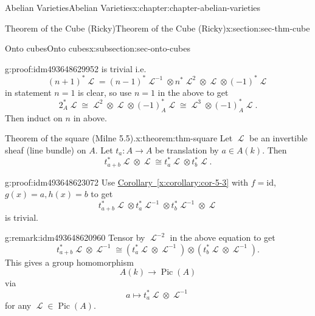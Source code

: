 \documentclass[oneside,10pt,]{book}
\numberwithin{equation}{section}
\newcommand{\sheaf}[1]{\operatorname{\mathcal{#1}}}
\newcommand{\id}{\mathrm{id}}
\DeclareMathOperator{\Pic}{Pic}
\begin{document}
\begin{chapterptx}{Abelian Varieties}{}{Abelian Varieties}{}{}{x:chapter:chapter-abelian-varieties}
\begin{sectionptx}{Theorem of the Cube (Ricky)}{}{Theorem of the Cube (Ricky)}{}{}{x:section:sec-thm-cube}
\begin{subsectionptx}{Onto cubes}{}{Onto cubes}{}{}{x:subsection:sec-onto-cubes}
\begin{proofptx}{}{g:proof:idm493648629952}
is trivial i.e.%
\begin{equation*}
(n+1)^*\sheaf L =  (n-1)^*\sheaf L^{-1}\otimes n^*\sheaf L^2 \otimes   \sheaf L \otimes   (-1)^*\sheaf L
\end{equation*}
in statement \(n = 1\) is clear, so use \(n=1\) in the above to get%
\begin{equation*}
2_A^*\sheaf L \cong \sheaf L^2 \otimes \sheaf L \otimes (-1)^*_A \sheaf L\cong \sheaf L^3 \otimes (-1)_A^*\sheaf  L\text{.}
\end{equation*}
Then induct on \(n\) in above.%
\end{proofptx}
\begin{theorem}{Theorem of the square (Milne 5.5).}{}{x:theorem:thm-square}%
Let \(\sheaf L\) be an invertible sheaf (line bundle) on \(A\). Let \(t_a \colon A\to A\) be translation by \(a\in A(k)\). Then%
\begin{equation*}
t_{a+b}^*\sheaf L \otimes \sheaf L \cong t_a^*\sheaf L \otimes t_b^* \sheaf L\text{.}
\end{equation*}
%
\end{theorem}
\begin{proofptx}{}{g:proof:idm493648623072}
Use \hyperref[x:corollary:cor-5-3]{Corollary~\ref{x:corollary:cor-5-3}} with \(f=  \id\), \(g(x)  = a, h(x) = b\) to get%
\begin{equation*}
t_{a+b}^*\sheaf L \otimes t_{a}^*\sheaf L ^{-1}\otimes t_b^* \sheaf L ^{-1} \otimes \sheaf L
\end{equation*}
is trivial.%
\end{proofptx}
\begin{remark}{}{g:remark:idm493648620960}%
Tensor by \(\sheaf L^{-2}\) in the above equation to get%
\begin{equation*}
t_{a+b}^*\sheaf L \otimes\sheaf L^{-1} \cong ( t_{a}^*\sheaf L \otimes \sheaf L^{-1}) \otimes(t_b^* \sheaf L\otimes \sheaf L^{-1})\text{.}
\end{equation*}
This gives a group homomorphism%
\begin{equation*}
A(k) \to \Pic(A)
\end{equation*}
via%
\begin{equation*}
a\mapsto t_a^*\sheaf L \otimes \sheaf L^{-1}
\end{equation*}
for any \(\sheaf L \in \Pic(A)\).%
\end{remark}
\end{subsectionptx}
\end{sectionptx}
%
%
\typeout{************************************************}

\end{chapterptx}
\end{document}
